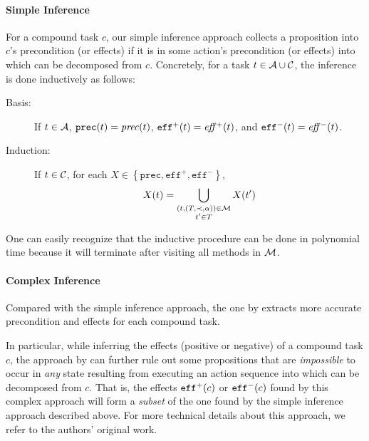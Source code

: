 \paragraph{Simple Inference} For a compound task $c$, our simple inference approach collects a proposition into $c$'s precondition (or effects) if it is in some action's precondition (or effects) into which can be decomposed from $c$. 
Concretely, for a task $t \in \mathcal{A}{} \cup \mathcal{C}{}$, the inference is done inductively as follows:
\begin{description}
    \item[Basis:] If $t \in \mathcal{A}{}$, $\mathtt{prec}(t) = \mathit{prec}(t)$, $\mathtt{eff}^{+}(t) = \mathit{eff}{}^{+}(t)$, and $\mathtt{eff}^{-}(t) = \mathit{eff}{}^{-}(t)$.
    \item[Induction:] If $t \in \mathcal{C}{}$, for each $X \in \left\{\mathtt{prec}, \mathtt{eff}^{+}, \mathtt{eff}^{-}\right\}$,
    \begin{displaymath}
        X(t) = \bigcup_{\substack{(t, (T, \mathord{\prec}{}, \alpha)) \in \mathcal{M}{}\\t' \in T}}X(t')
    \end{displaymath}
\end{description}

One can easily recognize that the inductive procedure can be done in polynomial time because it will terminate after visiting all methods in $\mathcal{M}{}$.  

\paragraph{Complex Inference} Compared with the simple inference approach, the one by  extracts more accurate precondition and effects for each compound task.

In particular, while inferring the effects (positive or negative) of a compound task $c$, the approach by  can further rule out some propositions that are \emph{impossible} to occur in \emph{any} state resulting from executing an action sequence into which can be decomposed from $c$. That is, the effects $\mathtt{eff}^{+}(c)$ or $\mathtt{eff}^{-}(c)$ found by this complex approach will form a \emph{subset} of the one found by the simple inference approach described above. For more technical details about this approach, we refer to the authors' original work.

